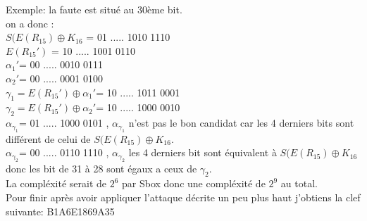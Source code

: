 \documentclass[a4paper]{report}
\begin{document}
			Exemple: la faute est situé au 30ème bit.\\
			
			on a donc :\\
			$S(E(R_{15})\oplus K_{16}$ = 01 ..... 1010 1110\\
			$E(R_{15}')$ = 10 ..... 1001 0110\\
			$\alpha_1'$= 00 ..... 0010 0111\\
			$\alpha_2'$= 00 ..... 0001 0100\\
			$\gamma_1=E(R_{15}')\oplus \alpha_1'$= 10 ..... 1011 0001\\
			$\gamma_2=E(R_{15}')\oplus \alpha_2'$= 10 ..... 1000 0010\\
			$\alpha_{\gamma_1}$= 01 ..... 1000 0101 , $\alpha_{\gamma_1}$ n'est pas le bon candidat car les 4 derniers bits sont différent de celui de $S(E(R_{15})\oplus K_{16}$.\\
			$\alpha_{\gamma_2}$= 00 ..... 0110 1110 , $\alpha_{\gamma_2}$ les 4 derniers bit sont équivalent à $S(E(R_{15})\oplus K_{16}$ donc les bit de 31 à 28 sont égaux a ceux de $\gamma_2$.\\
			
			La compléxité serait de $2^{6}$ par Sbox donc une compléxité de $2^{9}$ au total.\\
			Pour finir après avoir appliquer l'attaque décrite un peu plus haut j'obtiens la clef suivante: B1A6E1869A35
\end{document}
